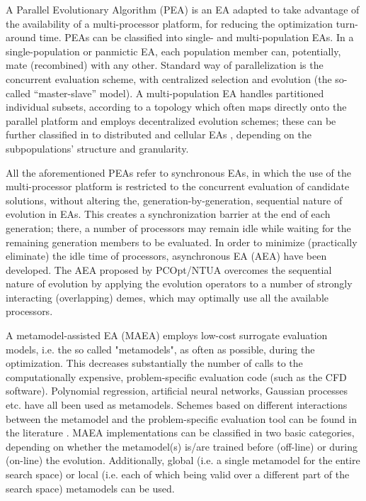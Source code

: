 A Parallel Evolutionary Algorithm (PEA) \cite{phd_Giotis,phd_Karakasis,phd_Kampolis,phd_Vera} is an EA adapted to take advantage of the availability of a multi-processor platform, for reducing the optimization turn-around time. PEAs can be classified into single- and multi-population EAs. In a single-population or panmictic EA, each population member can, potentially, mate (recombined) with any other. Standard way of parallelization is the concurrent evaluation scheme, with centralized selection and evolution (the so-called ``master-slave'' model). A multi-population EA handles partitioned individual subsets, according to a topology which often maps directly onto the parallel platform and employs decentralized evolution schemes; these can be further classified in to distributed \cite{LTT_2_023,Herr1999,LTT_2_044} and cellular EAs \cite{alba_08,Nebro:2009p48}, depending on the subpopulations’ structure and granularity. 

All the aforementioned PEAs refer to synchronous EAs, in which the use of the multi-processor platform is restricted to the concurrent evaluation of candidate solutions, without altering the, generation-by-generation, sequential nature of evolution in EAs. This creates a synchronization barrier at the end of each generation; there, a number of processors may remain idle while waiting for the remaining generation members to be evaluated.  In order to minimize (practically eliminate) the idle time of processors, asynchronous EA (AEA) \cite{LTT_2_040,Alba2001} have been developed. The AEA proposed by PCOpt/NTUA overcomes the sequential nature of evolution by applying the evolution operators to a number of strongly interacting (overlapping) demes, which may optimally use all the available processors.     

A metamodel-assisted EA (MAEA) employs low-cost surrogate evaluation models, i.e. the so called "metamodels", as often as possible, during the optimization. This decreases substantially the number of calls to the computationally expensive, problem-specific evaluation code (such as the CFD software). Polynomial regression, artificial neural networks, Gaussian processes etc. have all been used as metamodels. Schemes based on different interactions between the metamodel and the problem-specific evaluation tool can be found in the literature \cite{KEANEbook,LTT_2_020,Jin2002,LTT_2_027}. MAEA implementations can be classified in two basic categories, depending on whether the metamodel(s) is/are trained before (off-line) or during (on-line) the evolution. Additionally, global (i.e. a single metamodel for the entire search space) or local (i.e. each of which being valid over a different part of the search space) metamodels can be used.

